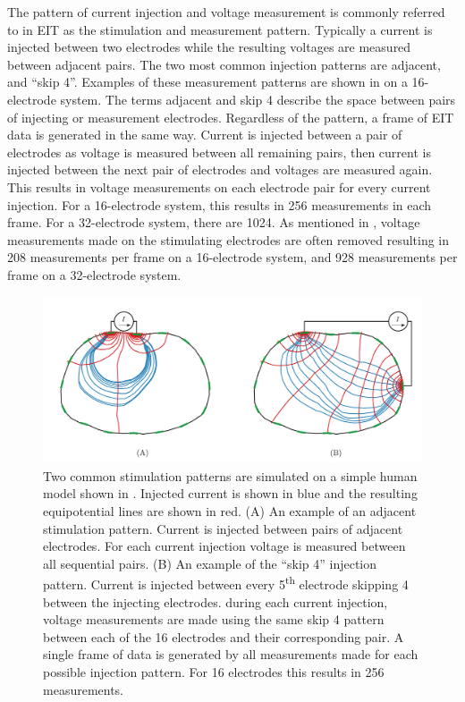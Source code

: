 The pattern of current injection and voltage measurement is commonly referred to in EIT 
as the stimulation and measurement pattern. Typically a current is injected between two electrodes
while the resulting voltages are measured between adjacent pairs. The two most common injection 
patterns are adjacent, and ``skip 4''. Examples of these measurement patterns are shown in 
 on a 16-electrode system. The terms adjacent and skip 4 describe 
the space between pairs of injecting or measurement electrodes. 
Regardless of the pattern, a frame of EIT data is generated in the same way. 
Current is injected between a pair of electrodes as voltage is measured between all 
remaining pairs, then current is injected between the next pair of electrodes and
voltages are measured again. This results in voltage measurements on each electrode 
pair for every current injection. For a 16-electrode system, this results in 
256 measurements in each frame. For a 32-electrode system, there are 1024. As mentioned in 
, voltage measurements made on the stimulating electrodes
are often removed resulting in 208 measurements per frame on a 16-electrode system, and 928 measurements per frame on a 32-electrode system.  

\begin{figure}
    \includegraphics[width=\textwidth]{chapter2-background/imgs/common_stim_meas_patterns.pdf}
    \caption[Adjacent and "skip 4" stimulation patterns]{\label{fig:stim_meas_bkgnd} 
    Two common stimulation patterns are simulated on a simple human model shown in 
    . Injected current is shown in blue and the resulting equipotential 
    lines are shown in red.
    (A) An example of an adjacent stimulation pattern. Current is injected between 
    pairs of adjacent electrodes. For each current injection voltage is 
    measured between all sequential pairs. 
    (B) An example of the ``skip 4'' injection pattern. Current is injected between every
    5\textsuperscript{th} electrode skipping 4 between the injecting electrodes. 
    during each current injection, voltage measurements are made using the same skip 4 
    pattern between each of the 16 electrodes and their corresponding pair. 
    A single frame of data is generated by all measurements made for each possible injection
    pattern. For 16 electrodes this results in 256 measurements.}
 \end{figure}


